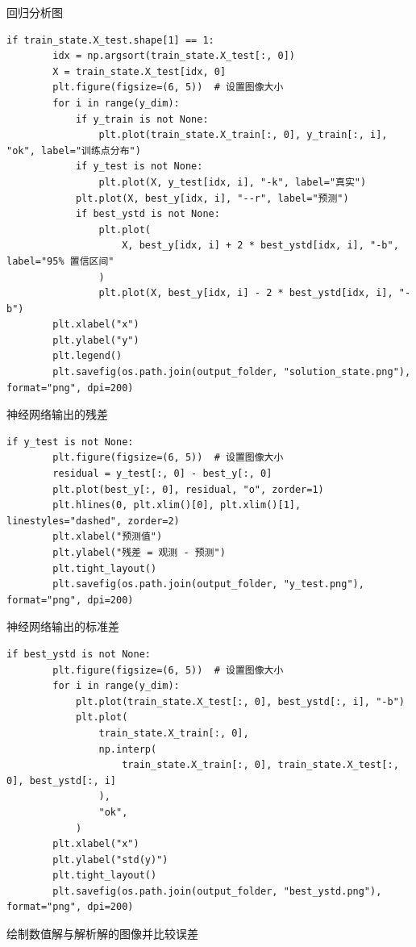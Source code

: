 \documentclass{Sichuan Normal University}
\begin{document}
回归分析图
\begin{lstlisting}[style=python,basicstyle=\footnotesize\fontspec{Courier New},]         
    if train_state.X_test.shape[1] == 1:
        idx = np.argsort(train_state.X_test[:, 0])
        X = train_state.X_test[idx, 0]
        plt.figure(figsize=(6, 5))  # 设置图像大小
        for i in range(y_dim):
            if y_train is not None:
                plt.plot(train_state.X_train[:, 0], y_train[:, i], "ok", label="训练点分布")
            if y_test is not None:
                plt.plot(X, y_test[idx, i], "-k", label="真实")
            plt.plot(X, best_y[idx, i], "--r", label="预测")
            if best_ystd is not None:
                plt.plot(
                    X, best_y[idx, i] + 2 * best_ystd[idx, i], "-b", label="95% 置信区间"
                )
                plt.plot(X, best_y[idx, i] - 2 * best_ystd[idx, i], "-b")
        plt.xlabel("x")
        plt.ylabel("y")
        plt.legend()
        plt.savefig(os.path.join(output_folder, "solution_state.png"), format="png", dpi=200)
\end{lstlisting}  
神经网络输出的残差
\begin{lstlisting}[style=python,basicstyle=\footnotesize\fontspec{Courier New},]  
    if y_test is not None:
        plt.figure(figsize=(6, 5))  # 设置图像大小
        residual = y_test[:, 0] - best_y[:, 0]
        plt.plot(best_y[:, 0], residual, "o", zorder=1)
        plt.hlines(0, plt.xlim()[0], plt.xlim()[1], linestyles="dashed", zorder=2)
        plt.xlabel("预测值")
        plt.ylabel("残差 = 观测 - 预测")
        plt.tight_layout()
        plt.savefig(os.path.join(output_folder, "y_test.png"), format="png", dpi=200)
\end{lstlisting}  
神经网络输出的标准差
\begin{lstlisting}[style=python,basicstyle=\footnotesize\fontspec{Courier New},]
    if best_ystd is not None:
        plt.figure(figsize=(6, 5))  # 设置图像大小
        for i in range(y_dim):
            plt.plot(train_state.X_test[:, 0], best_ystd[:, i], "-b")
            plt.plot(
                train_state.X_train[:, 0],
                np.interp(
                    train_state.X_train[:, 0], train_state.X_test[:, 0], best_ystd[:, i]
                ),
                "ok",
            )
        plt.xlabel("x")
        plt.ylabel("std(y)")
        plt.tight_layout()
        plt.savefig(os.path.join(output_folder, "best_ystd.png"), format="png", dpi=200)
\end{lstlisting}  
绘制数值解与解析解的图像并比较误差
\end{document}
